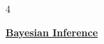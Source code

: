 \documentclass[landscape, 8pt]{extarticle}
\begin{document}
\begin{multicols*}{4}

{\footnotesize \textbf{\underline{Bayesian Inference}}}

	{\tiny\textbf{\underline{}}}
		
		
		
		
		
		
		
\end{multicols*}	
	
\end{document}
